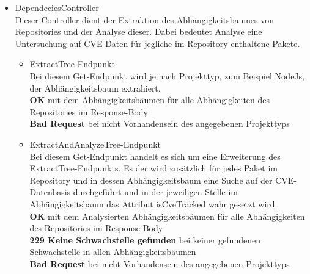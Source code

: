 \begin{itemize}
        \item DependeciesController \label{api_controller:two} \\
            Dieser Controller dient der Extraktion des Abhängigkeitsbaumes von Repositories und der Analyse dieser.
            Dabei bedeutet Analyse eine Untersuchung auf \ac{CVE}-Daten für jegliche im Repository enthaltene Pakete.
            \begin{itemize}
                \item ExtractTree-Endpunkt \\
                    Bei diesem Get-Endpunkt wird je nach Projekttyp, zum Beispiel NodeJs, der Abhängigkeitsbaum extrahiert.
                    \\
                    \textbf{OK} mit dem Abhängigkeitsbäumen für alle Abhängigkeiten des Repositories im Response-Body
                    \\
                    \textbf{Bad Request} bei nicht Vorhandensein des angegebenen Projekttyps
                \item ExtractAndAnalyzeTree-Endpunkt \\
                    Bei diesem Get-Endpunkt handelt es sich um eine Erweiterung des ExtractTree-Endpunkts.
                    Es der wird zusätzlich für jedes Paket im Repository und in dessen Abhängigkeitsbaum eine Suche auf der CVE-Datenbasis durchgeführt und in der jeweiligen Stelle im Abhängigkeitsbaum das Attribut isCveTracked wahr gesetzt wird.
                    \\
                    \textbf{OK} mit dem Analysierten Abhängigkeitsbäumen für alle Abhängigkeiten des Repositories im Response-Body
                    \\
                    \textbf{229 Keine Schwachstelle gefunden} bei keiner gefundenen Schwachstelle in allen Abhängigkeitsbäumen
                    \\
                    \textbf{Bad Request} bei nicht Vorhandensein des angegebenen Projekttyps
            \end{itemize}


\end{itemize}
